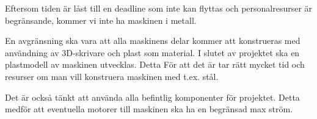 Eftersom tiden är låst till en deadline som inte kan flyttas och personalresurser är begränsande, kommer vi inte ha maskinen i metall. 


En avgränsning ska vara att alla maskinens delar kommer att konstrueras med användning av 3D-skrivare och plast som material. I slutet av projektet ska en plastmodell av maskinen utvecklas. Detta För att det är tar rätt mycket tid och resurser om man vill konstruera maskinen med t.ex. stål. 

Det är också tänkt att använda alla befintlig komponenter för projektet. Detta medför att eventuella motorer till maskinen ska ha en begränsad max ström.